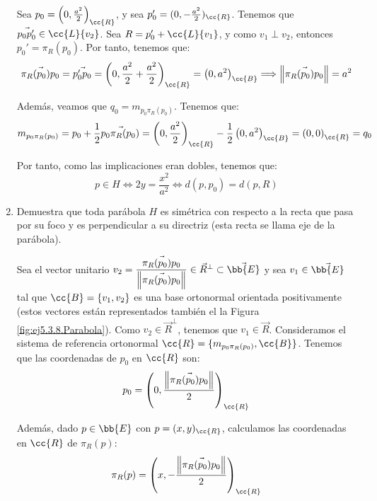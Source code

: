 \begin{ejercicio}
\begin{enumerate}
    Sea $p_0 = \left(0, \frac{a^2}{2}\right)_{\cc{R}}$, y sea $p_0'=(0, -\frac{a^2}{2})_{\cc{R}}$. Tenemos que $\vec{p_0p_0'}\in \cc{L}\{v_2\}$. Sea $R=p_0'+\cc{L}\{v_1\}$, y como
    $v_1\perp v_2$, entonces $p_0' = \pi_R(p_0)$. Por tanto, tenemos que:
    \begin{equation*}
        \vec{\pi_R(p_0)p_0}
        =\vec{p_0'p_0} = \left(0, \frac{a^2}{2} + \frac{a^2}{2}\right)_{\cc{R}} = \left(0, a^2\right)_{\cc{B}} \Longrightarrow \left\|\vec{\pi_R(p_0)p_0}\right\| = a^2
    \end{equation*}

    Además, veamos que $q_0 = m_{p_0\pi_R(p_0)}$. Tenemos que:
    \begin{equation*}
        m_{p_0\pi_R(p_0)} = p_0 + \frac{1}{2}\vec{p_0\pi_R(p_0)} = \left(0, \frac{a^2}{2}\right)_{\cc{R}} - \frac{1}{2}\left(0, a^2\right)_{\cc{B}} = \left(0, 0\right)_{\cc{R}} = q_0
    \end{equation*}

    Por tanto, como las implicaciones eran dobles, tenemos que:
    \begin{equation*}
        p\in H \Longleftrightarrow 2y = \frac{x^2}{a^2} \Longleftrightarrow d(p,p_0) = d(p,R)
    \end{equation*}

    \item Demuestra que toda parábola $H$ es simétrica con respecto a la recta que pasa por su foco y es perpendicular a su directriz (esta recta se llama eje de la parábola).
    
    Sea el vector unitario $v_2=\dfrac{\vec{\pi_R(p_0)p_0}}{\left\|\vec{\pi_R(p_0)p_0}\right\|}\in \vec{R}^\perp \subset \vec{\bb{E}}$ y sea $v_1\in \vec{\bb{E}}$ tal que $\cc{B}=\{v_1,v_2\}$ es una base ortonormal orientada positivamente (estos vectores están representados también el la Figura \ref{fig:ej5.3.8.Parabola}).
    Como $v_2\in \vec{R}^\perp$, tenemos que $v_1\in \vec{R}$. Consideramos el sistema de referencia ortonormal $\cc{R}=\{m_{p_0\pi_R(p_0)},\cc{B}\}$. Tenemos que las coordenadas de $p_0$ en $\cc{R}$ son:
    \begin{equation*}
        p_0 = \left(0, \dfrac{\left\|\vec{\pi_R(p_0)p_0}\right\|}{2}\right)_{\cc{R}}
    \end{equation*}

    Además, dado $ p\in \bb{E}$ con $p=(x,y)_{\cc{R}}$, calculamos las coordenadas en $\cc{R}$ de $\pi_R(p)$:
    \begin{equation*}
        \pi_R(p) = \left(x, -\dfrac{\left\|\vec{\pi_R(p_0)p_0}\right\|}{2}\right)_{\cc{R}}
    \end{equation*}
    

\end{enumerate}
\end{ejercicio}
